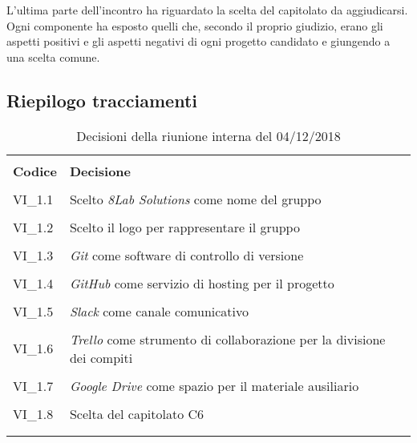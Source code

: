 L'ultima parte dell'incontro ha riguardato la scelta del capitolato da aggiudicarsi. Ogni componente ha esposto quelli che, secondo il proprio giudizio, erano gli aspetti positivi e gli aspetti negativi di ogni progetto candidato e giungendo a una scelta comune.

\subsection{Riepilogo tracciamenti}
\begin{centering}
\begin{longtable}{ >{\centering}p{4cm} >{\centering}p{11cm} }

\hline
\\[0.5pt]
	\textbf{Codice} & \textbf{Decisione} 
	
	\tabularnewline 
	\hline
	
				\\[0.5pt]
				VI\_1.1 & Scelto \textit{8Lab Solutions} come nome del gruppo
				\tabularnewline
				\hline
						
				\\[0.5pt]
				VI\_1.2 & Scelto il logo per rappresentare il gruppo
				\tabularnewline
				\hline
				
				\\[0.5pt]
				VI\_1.3 & \textit{Git} come software di controllo di versione
				\tabularnewline
				\hline
				
				\\[0.5pt]				
				VI\_1.4 & \textit{GitHub} come servizio di hosting per il progetto
				\tabularnewline
				\hline
				
				\\[0.5pt]
				VI\_1.5 & \textit{Slack} come canale comunicativo 
				\tabularnewline
				\hline
				
				\\[0.5pt]
				VI\_1.6 & \textit{Trello} come strumento di collaborazione per la divisione dei compiti
				\tabularnewline
				\hline
		
				\\[0.5pt]
				VI\_1.7 & \textit{Google Drive} come spazio per il materiale ausiliario
				\tabularnewline
				\hline
			
				\\[0.5pt]
				VI\_1.8 & Scelta del capitolato C6
				\tabularnewline
              	\hline 
           	
                
        \\[1.5pt]
        \caption{Decisioni della riunione interna del 04/12/2018}
\end{longtable}
\end{centering}

